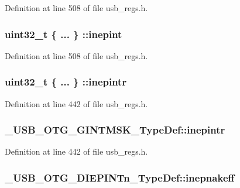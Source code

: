 Definition at line 508 of file usb\-\_\-regs.\-h.

\hypertarget{group___u_s_b___o_t_g___d_r_i_v_e_r_ga2d9ceca9ac9281e6b3df671e0ded5693}{
\subsubsection[{inepint}]{\setlength{\rightskip}{0pt plus 5cm}uint32\-\_\-t \{ ... \} \-::inepint}}\label{group___u_s_b___o_t_g___d_r_i_v_e_r_ga2d9ceca9ac9281e6b3df671e0ded5693}


Definition at line 508 of file usb\-\_\-regs.\-h.

\hypertarget{group___u_s_b___o_t_g___d_r_i_v_e_r_ga115cde105d6f134fa285166d4884924c}{
\subsubsection[{inepintr}]{\setlength{\rightskip}{0pt plus 5cm}uint32\-\_\-t \{ ... \} \-::inepintr}}\label{group___u_s_b___o_t_g___d_r_i_v_e_r_ga115cde105d6f134fa285166d4884924c}


Definition at line 442 of file usb\-\_\-regs.\-h.

\hypertarget{group___u_s_b___o_t_g___d_r_i_v_e_r_gab6b102fc65c62b3147c80449d950d46b}{
\subsubsection[{inepintr}]{ \-\_\-\-U\-S\-B\-\_\-\-O\-T\-G\-\_\-\-G\-I\-N\-T\-M\-S\-K\-\_\-\-Type\-Def\-::inepintr}}\label{group___u_s_b___o_t_g___d_r_i_v_e_r_gab6b102fc65c62b3147c80449d950d46b}


Definition at line 442 of file usb\-\_\-regs.\-h.

\hypertarget{group___u_s_b___o_t_g___d_r_i_v_e_r_ga690132de792f85a88564f1792fee3765}{
\subsubsection[{inepnakeff}]{ \-\_\-\-U\-S\-B\-\_\-\-O\-T\-G\-\_\-\-D\-I\-E\-P\-I\-N\-Tn\-\_\-\-Type\-Def\-::inepnakeff}}\label{group___u_s_b___o_t_g___d_r_i_v_e_r_ga690132de792f85a88564f1792fee3765}


